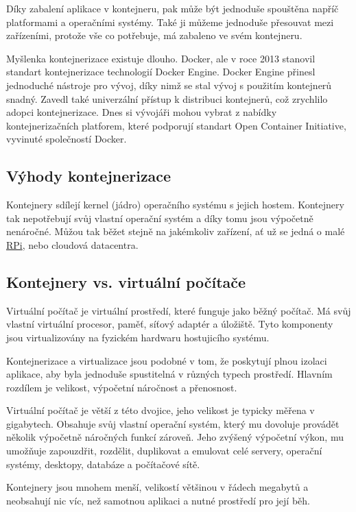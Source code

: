 \documentclass[czech,12pt,a4paper]{article}
\begin{document}
Díky zabalení aplikace v kontejneru, pak může být jednoduše spouštěna napříč platformami a operačními systémy. Také ji můžeme jednoduše přesouvat mezi zařízeními, protože vše co potřebuje, má zabaleno ve svém kontejneru.

Myšlenka kontejnerizace existuje dlouho. Docker, ale v roce 2013 stanovil standart kontejnerizace technologií Docker Engine. Docker Engine přinesl jednoduché nástroje pro vývoj, díky nimž se stal vývoj s použitím kontejnerů snadný. Zavedl také univerzální přístup k distribuci kontejnerů, což zrychlilo adopci kontejnerizace. Dnes si vývojáři mohou vybrat z nabídky kontejnerizačních platforem, které podporují standart Open Container Initiative, vyvinuté společností Docker.

\subsection{Výhody kontejnerizace}

Kontejnery sdílejí kernel (jádro) operačního systému s jejich hostem. Kontejnery tak nepotřebují svůj vlastní operační systém a díky tomu jsou výpočetně nenáročné. Můžou tak běžet stejně na jakémkoliv zařízení, ať už se jedná o malé \underline{\ac{RPi}}, nebo cloudová datacentra.

\subsection{Kontejnery vs. virtuální počítače}

Virtuální počítač je virtuální prostředí, které funguje jako běžný počítač. Má svůj vlastní virtuální procesor, paměť, síťový adaptér a úložiště. Tyto komponenty jsou virtualizovány na fyzickém hardwaru hostujicího systému.

Kontejnerizace a virtualizace jsou podobné v tom, že poskytují plnou izolaci aplikace, aby byla jednoduše spustitelná v různých typech prostředí. Hlavním rozdílem je velikost, výpočetní náročnost a přenosnost.

Virtuální počítač je větší z této dvojice, jeho velikost je typicky měřena v gigabytech. Obsahuje svůj vlastní operační systém, který mu dovoluje provádět několik výpočetně náročných funkcí zároveň. Jeho zvýšený výpočetní výkon, mu umožňuje zapouzdřit, rozdělit, duplikovat a emulovat celé servery, operační systémy, desktopy, databáze a počítačové sítě.

Kontejnery jsou mnohem menší, velikostí většinou v řádech megabytů a neobsahují nic víc, než samotnou aplikaci a nutné prostředí pro její běh.
\end{document}
